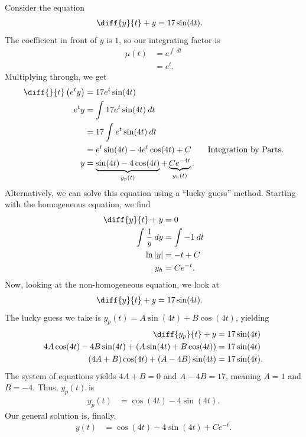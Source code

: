 \documentclass[10pt]{mypackage}
\begin{document}
\begin{example}
  Consider the equation
  \begin{align*}
    \diff{y}{t} + y &= 17\sin(4t).
  \end{align*}
  The coefficient in front of $y$ is $1$, so our integrating factor is
  \begin{align*}
    \mu(t) &= e^{\int_{}^{} \:dt}\\
           &= e^{t}.
  \end{align*}
  Multiplying through, we get
  \begin{align*}
    \diff{}{t}\left(e^{t} y\right) &= 17e^{t}\sin(4t)\\
    e^{t} y &= \int_{}^{} 17e^{t}\sin(4t)\:dt\\
            &= 17\int_{}^{} e^{t}\sin(4t)\:dt\\
            &= e^{t}\sin(4t) - 4e^{t}\cos(4t)+ C\tag*{Integration by Parts.}\\
    y &= \underbrace{\sin(4t) - 4\cos(4t)}_{y_p(t)} + \underbrace{Ce^{-4t}}_{y_h(t)}.
  \end{align*}
  Alternatively, we can solve this equation using a ``lucky guess'' method. Starting with the homogeneous equation, we find
  \begin{align*}
    \diff{y}{t} + y &=0 \\
    \int_{}^{} \frac{1}{y}\:dy &= \int_{}^{} -1\:dt\\
    \ln \left\vert y \right\vert &= -t + C\\
    y_h &= Ce^{-t}.
  \end{align*}
  Now, looking at the non-homogeneous equation, we look at
  \begin{align*}
    \diff{y}{t} + y &= 17 \sin(4t).
  \end{align*}
  The lucky guess we take is $y_p(t) = A\sin(4t) + B\cos(4t)$, yielding
  \begin{align*}
    \diff{y_p}{t} + y &= 17\sin(4t)\\
    4A\cos(4t) - 4B\sin(4t) + \left(A \sin(4t) + B\cos(4t)\right) &= 17\sin(4t)\\
    (4A + B)\cos(4t) + \left(A - 4B\right)\sin(4t) &= 17\sin(4t).
  \end{align*}
  The system of equations yields $4A + B = 0$ and $A - 4B = 17$, meaning $A = 1$ and $B = -4$. Thus, $y_p(t)$ is
  \begin{align*}
    y_p(t) &= \cos(4t) - 4\sin(4t).
  \end{align*}
  Our general solution is, finally,
  \begin{align*}
    y(t) &= \cos(4t) - 4\sin(4t) + Ce^{-t}.
  \end{align*}
\end{example}
\end{document}
